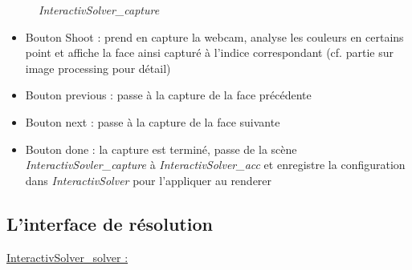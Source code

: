 \begin{figure}[h]
\begin{center}
\end{center}
	\caption{ \textit{InteractivSolver\_capture}}
\end{figure}

\begin{itemize}
    \item Bouton Shoot : prend en capture la webcam, analyse les couleurs en certains point et affiche la face ainsi capturé à l’indice correspondant (cf. partie sur image processing pour détail)
    \item Bouton previous : passe à la capture de la face précédente
    \item Bouton next : passe à la capture de la face suivante
    \item Bouton done : la capture est terminé, passe de la scène \textit{InteractivSovler\_capture} à \textit{InteractivSolver\_acc} et enregistre la configuration dans \textit{InteractivSolver} pour l'appliquer au renderer
\end{itemize}

\subsection{L'interface de résolution}
\underline{InteractivSolver\_solver :}

